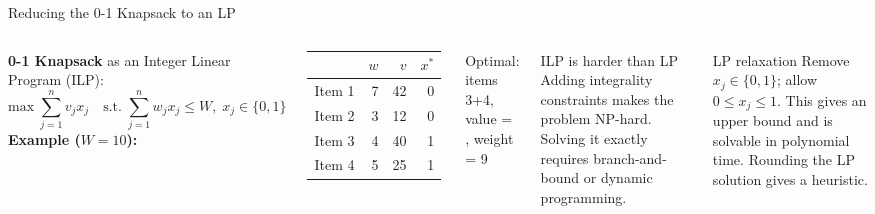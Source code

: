\documentclass[aspectratio=169]{beamer}
\begin{document}
\begin{frame}[shrink=12]{Reducing the 0-1 Knapsack to an LP}
  \begin{columns}[T]
      \textbf{0-1 Knapsack} as an Integer Linear Program (ILP):
      \[
        \text{max}\;\sum_{j=1}^n v_j x_j
        \quad\text{s.t.}\;\sum_{j=1}^n w_j x_j \leq W,\;
        x_j \in \{0,1\}
      \]
      \vspace{0.3em}
      \textbf{Example ($W=10$):}
      \begin{tabular}{lrrr}
        \toprule
        & $w$ & $v$ & $x^*$ \\
        \midrule
        Item 1 & 7 & 42 & 0 \\
        Item 2 & 3 & 12 & 0 \\
        Item 3 & 4 & 40 & \textcolor{SuccessGreen}{1} \\
        Item 4 & 5 & 25 & \textcolor{SuccessGreen}{1} \\
        \bottomrule
      \end{tabular}
      \vspace{0.2em}
      Optimal: items 3+4, value = , weight = 9
      \begin{alertblock}{ILP is harder than LP}
        Adding integrality constraints makes the problem NP-hard.
        Solving it exactly requires branch-and-bound or
        dynamic programming.
      \end{alertblock}
      \vspace{0.3em}
      \begin{exampleblock}{LP relaxation}
        Remove $x_j\in\{0,1\}$; allow $0\leq x_j\leq 1$.
        This gives an upper bound and is solvable in polynomial time.
        Rounding the LP solution gives a heuristic.
      \end{exampleblock}
  \end{columns}
\end{frame}
\end{document}
